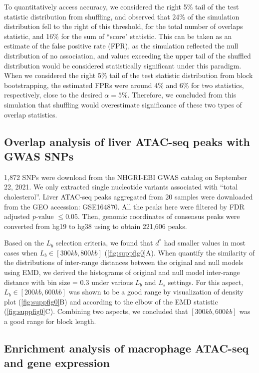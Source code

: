 \documentclass{article}
\begin{document}
  To quantitatively access accuracy, we considered the right 5\% tail of
  the test statistic distribution from shuffling, and observed that 24\%
  of the simulation distribution fell to the right of this
  threshold, for the total number of overlaps statistic, and 16\% for the 
  sum of ``score" statistic.
  This can be taken as an estimate of the 
  false positive rate (FPR), as the simulation reflected the null
  distribution of no association, and values exceeding the upper tail
  of the shuffled distribution would be considered statistically
  significant under this paradigm.
  When we considered the
  right 5\% tail of the test statistic distribution from block
  bootstrapping, the estimated FPRs were around 4\% and 6\% for two statistics, respectively, close to the
  desired $\alpha = 5\%$.
  Therefore, we concluded from this simulation that shuffling would
  overestimate significance of these two types of overlap statistics.


\subsection{Overlap analysis of liver ATAC-seq peaks with GWAS SNPs} \label{sec:liveratac}

1,872 SNPs were download from the NHGRI-EBI GWAS catalog
\citep{gwascatalog} on September 22, 2021. We only extracted single
nucleotide variants associated with ``total cholesterol''. Liver ATAC-seq peaks
\citep{CURRIN20211169} aggregated from 20 samples were downloaded from
the GEO accession: GSE164870. All the peaks here were filtered by FDR adjusted \textit{p}-value $\leq 0.05$.
Then, genomic coordinates of consensus peaks were converted from hg19 to
hg38 using  to obtain 221,606 peaks.

Based on the $L_b$ selection criteria, we found that $d^*$ had
smaller values in most cases when $L_b \in [300kb,800kb]$
(\cref{fig:suppfig0}A). When quantify the similarity of the distributions of
inter-range distances between the original and 
null models using EMD, we derived the histograms of
original and
null model inter-range distance with bin size = 0.3 under various
$L_b$ and $L_s$ settings.
For this aspect, $L_b \in [200kb,600kb]$ was
shown to be a good range by visualization of density plot
(\cref{fig:suppfig0}B) and according to the elbow of the EMD statistic
(\cref{fig:suppfig0}C). Combining two aspects, we concluded that $[300kb,600kb]$ was a good range for block length.

\subsection{Enrichment analysis of macrophage ATAC-seq and gene expression}\label{sec:splines}
\end{document}
